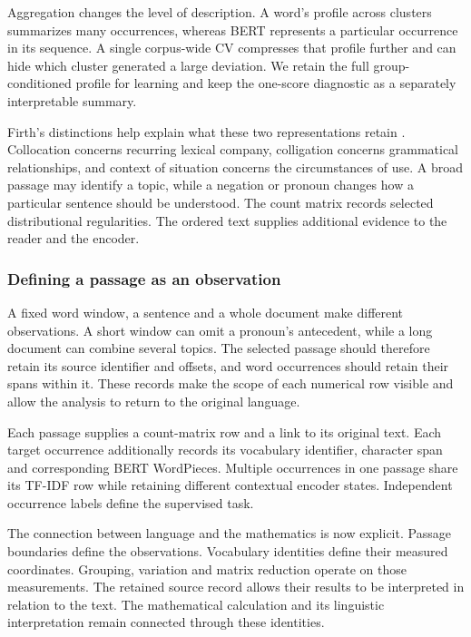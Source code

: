\documentclass[10pt,letterpaper]{article}
\begin{document}
Aggregation changes the level of description. A word's profile across clusters summarizes many occurrences, whereas BERT represents a particular occurrence in its sequence. A single corpus-wide CV compresses that profile further and can hide which cluster generated a large deviation. We retain the full group-conditioned profile for learning and keep the one-score diagnostic as a separately interpretable summary.\par

Firth's distinctions help explain what these two representations retain \cite{firth}. Collocation concerns recurring lexical company, colligation concerns grammatical relationships, and context of situation concerns the circumstances of use. A broad passage may identify a topic, while a negation or pronoun changes how a particular sentence should be understood. The count matrix records selected distributional regularities. The ordered text supplies additional evidence to the reader and the encoder.\par

\subsubsection{Defining a passage as an observation}
A fixed word window, a sentence and a whole document make different observations. A short window can omit a pronoun's antecedent, while a long document can combine several topics. The selected passage should therefore retain its source identifier and offsets, and word occurrences should retain their spans within it. These records make the scope of each numerical row visible and allow the analysis to return to the original language.\par

Each passage supplies a count-matrix row and a link to its original text. Each target occurrence additionally records its vocabulary identifier, character span and corresponding BERT WordPieces. Multiple occurrences in one passage share its TF-IDF row while retaining different contextual encoder states. Independent occurrence labels define the supervised task.\par

The connection between language and the mathematics is now explicit. Passage boundaries define the observations. Vocabulary identities define their measured coordinates. Grouping, variation and matrix reduction operate on those measurements. The retained source record allows their results to be interpreted in relation to the text. The mathematical calculation and its linguistic interpretation remain connected through these identities.\par
\end{document}
